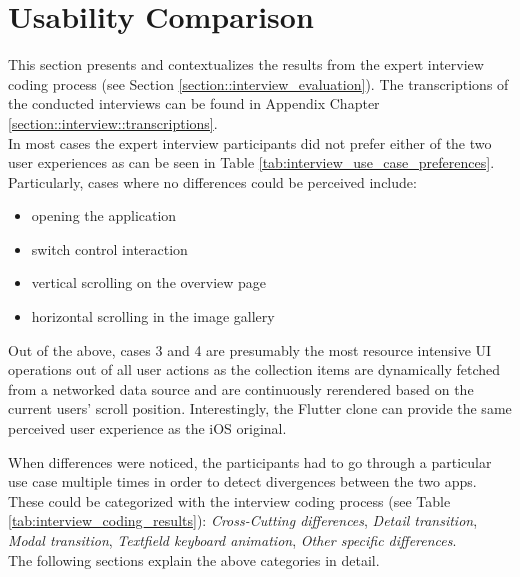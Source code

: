 \section{Usability Comparison} \label{section::usability_comparison}
This section presents and contextualizes the results from the expert interview coding process (see Section \ref{section::interview_evaluation}).
The transcriptions of the conducted interviews can be found in Appendix Chapter \ref{section::interview::transcriptions}.\\
In most cases the expert interview participants did not prefer either of the two user experiences as can be seen in Table \ref{tab:interview_use_case_preferences}.
Particularly, cases where no differences could be perceived include:
\begin{itemize}
    \item opening the application
    \item switch control interaction
    \item vertical scrolling on the overview page
    \item horizontal scrolling in the image gallery
\end{itemize}
Out of the above, cases 3 and 4 are presumably the most resource intensive UI operations out of all user actions as the collection items are dynamically fetched from a networked data source and are continuously rerendered based on the current users' scroll position.
Interestingly, the Flutter clone can provide the same perceived user experience as the iOS original.

When differences were noticed, the participants had to go through a particular use case multiple times in order to detect divergences between the two apps.
These could be categorized with the interview coding process (see Table \ref{tab:interview_coding_results}): \textit{Cross-Cutting differences}, \textit{Detail transition}, \textit{Modal transition}, \textit{Textfield keyboard animation}, \textit{Other specific differences}.\\
The following sections explain the above categories in detail.

\begin{table}[!htp]\centering
    \caption{Interview Use Case Cumulated Preference Choices}\label{tab:interview_use_case_preferences}
\end{table}

